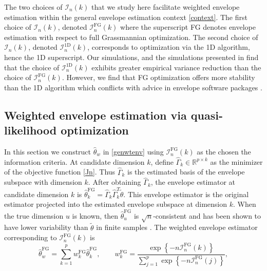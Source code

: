 \documentclass{article}\usepackage[]{graphicx}\usepackage[]{color}
\newcommand{\R}{\mathbb{R}}
\newcommand{\TFG}{\widehat{\theta}^{\text{FG}}}
\newcommand{\Ttil}{\widetilde{\theta}}
\newcommand{\rootn}{\sqrt{n}}
\newcommand{\EnvwFG}{\widehat{\theta}^{\text{FG}}_w}
\newcommand{\IoneD}{\mathcal{I}_n^{\text{1D}}}
\newcommand{\IFG}{\mathcal{I}_n^{\text{FG}}}
\newcommand{\In}{\mathcal{I}_n}
\newcommand{\wFG}{w^{\text{FG}}}
\begin{document}
The two choices of $\In(k)$ that we study here facilitate weighted envelope estimation within the general envelope estimation context \eqref{context}. The first choice of $\In(k)$, denoted $\IFG(k)$ where the superscript FG denotes envelope estimation with respect to full Grassmannian optimization. 
The second choice of $\In(k)$, denoted $\IoneD(k)$, corresponds to optimization via the 1D algorithm, hence the 1D superscript. 
Our simulations, and the simulations presented in \citet{zhangmai} find that the choice of $\IoneD(k)$ exhibits greater empirical variance reduction than the choice of $\IFG(k)$. However, we find that FG optimization offers more stability than the 1D algorithm which conflicts with advice in envelope software packages \citep{zeng2019TRES, zeng2020TRES}.


\subsection{Weighted envelope estimation via quasi-likelihood optimization}
\label{section:FG}

In this section we construct $\hat{\theta}_w$ in \eqref{genwtenv} using $\IFG(k)$ as the chosen the information criteria. At candidate dimension $k$, define $\widehat{\Gamma}_k \in \R^{p \times k}$ as the minimizer of the objective function \eqref{Jn}. Thus $\widehat{\Gamma}_k$ is the estimated basis of the envelope subspace with dimension $k$. After obtaining $\widehat{\Gamma}_k$, the envelope estimator at candidate dimension $k$ is $\TFG_k = \widehat{\Gamma}_k\widehat{\Gamma}_k^T\Ttil$. This envelope estimator is the original estimator projected into the estimated envelope subspace at dimension $k$. When the true dimension $u$ is known, then $\TFG_u$ is $\rootn$-consistent and has been shown to have lower variability than $\Ttil$ in finite samples \citep{cook2010, found, cook2018introduction}. The weighted envelope estimator corresponding to $\IFG(k)$ is  
\begin{equation} \label{envFG}
  \EnvwFG = \sum_{k=1}^p \wFG_k\TFG_k, 
    \qquad \wFG_k = \frac
  {
    \exp\left\{-n\IFG(k)\right\}
  }
  {
    \sum_{j=1}^p\exp\left\{-n\IFG(j)\right\}
  },
\end{equation}
\end{document}
